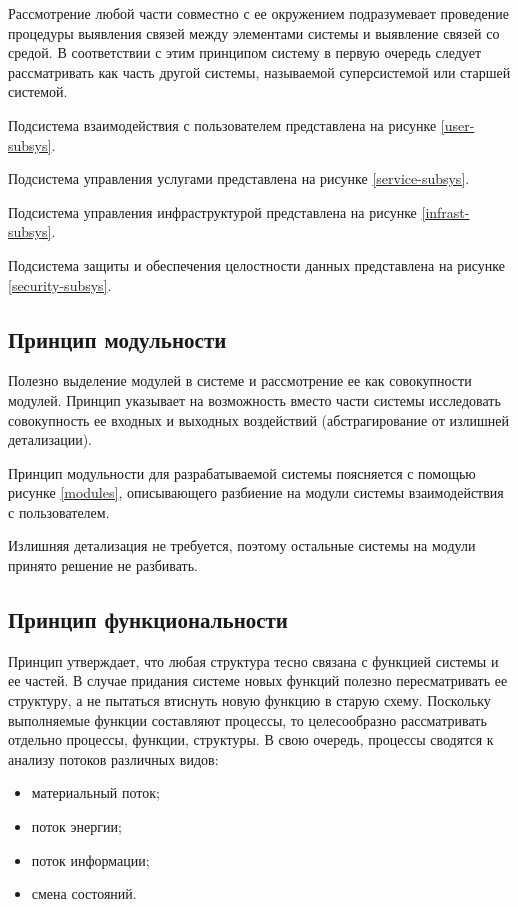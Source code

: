 Рассмотрение любой части совместно с ее окружением подразумевает проведение процедуры выявления связей между элементами системы и выявление связей со средой.
В соответствии с этим принципом систему в первую очередь следует рассматривать как часть другой системы, называемой суперсистемой или старшей системой.

Подсистема взаимодействия с пользователем представлена на рисунке \ref{user-subsys}.

Подсистема управления услугами представлена на рисунке \ref{service-subsys}.

Подсистема управления инфраструктурой представлена на рисунке \ref{infrast-subsys}.

Подсистема защиты и обеспечения целостности данных представлена на рисунке \ref{security-subsys}.

\subsection{Принцип модульности}

Полезно выделение модулей в системе и рассмотрение ее как совокупности модулей.
Принцип указывает на возможность вместо части системы исследовать совокупность ее входных и выходных воздействий (абстрагирование от излишней детализации).

Принцип модульности для разрабатываемой системы поясняется с помощью рисунке \ref{modules}, описывающего разбиение на модули системы взаимодействия с пользователем.

Излишняя детализация не требуется, поэтому остальные системы на модули принято решение не разбивать.

\subsection{Принцип функциональности}

Принцип утверждает, что любая структура тесно связана с функцией системы и ее частей.
В случае придания системе новых функций полезно пересматривать ее структуру, а не пытаться втиснуть новую функцию в старую схему.
Поскольку выполняемые функции составляют процессы, то целесообразно рассматривать отдельно процессы, функции, структуры.
В свою очередь, процессы сводятся к анализу потоков различных видов:
\begin{itemize}
  \item материальный поток;
  \item поток энергии;
  \item поток информации;
  \item смена состояний.
\end{itemize}

